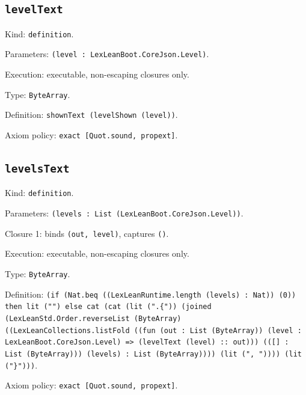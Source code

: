 \documentclass[11pt]{article}
\begin{document}
\subsection*{\texttt{levelText}}
\noindent Kind: \texttt{definition}.\par
\noindent Parameters: \texttt{(level : LexLeanBoot.CoreJson.Level)}.\par
\noindent Execution: executable, non-escaping closures only.\par
\noindent Type: \texttt{ByteArray}.\par
\noindent Definition: \texttt{shownText (levelShown (level))}.\par
\noindent Axiom policy: \texttt{exact [Quot.sound, propext]}.\par
\subsection*{\texttt{levelsText}}
\noindent Kind: \texttt{definition}.\par
\noindent Parameters: \texttt{(levels : List (LexLeanBoot.CoreJson.Level))}.\par
\noindent Closure 1: binds \texttt{(out, level)}, captures \texttt{()}.\par
\noindent Execution: executable, non-escaping closures only.\par
\noindent Type: \texttt{ByteArray}.\par
\noindent Definition: \texttt{(if (Nat.beq ((LexLeanRuntime.length (levels) : Nat)) (0)) then lit ("") else cat (cat (lit (".\{")) (joined (LexLeanStd.Order.reverseList (ByteArray) ((LexLeanCollections.listFold ((fun (out : List (ByteArray)) (level : LexLeanBoot.CoreJson.Level) => (levelText (level) :: out))) (([] : List (ByteArray))) (levels) : List (ByteArray)))) (lit (", ")))) (lit ("\}")))}.\par
\noindent Axiom policy: \texttt{exact [Quot.sound, propext]}.\par
\end{document}
